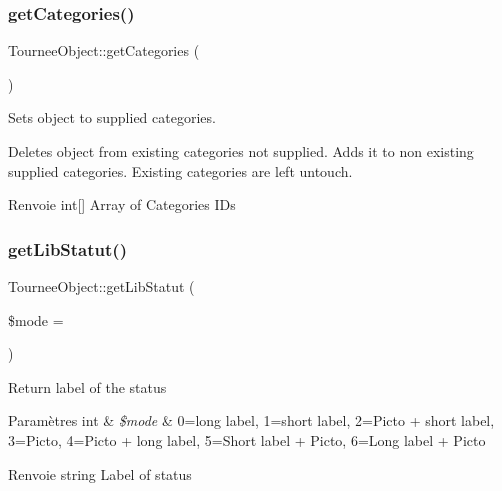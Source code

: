 \subsubsection{\texorpdfstring{get\+Categories()}{getCategories()}}
{\footnotesize\ttfamily Tournee\+Object\+::get\+Categories (\begin{DoxyParamCaption}{ }\end{DoxyParamCaption})}

Sets object to supplied categories.

Deletes object from existing categories not supplied. Adds it to non existing supplied categories. Existing categories are left untouch.

\begin{DoxyReturn}{Renvoie}
int\mbox{[}\mbox{]} Array of Categories I\+Ds 
\end{DoxyReturn}
\mbox{\label{classTourneeObject_a15de2c8fefd05e6d54d50e7508538216}} 
\subsubsection{\texorpdfstring{get\+Lib\+Statut()}{getLibStatut()}}
{\footnotesize\ttfamily Tournee\+Object\+::get\+Lib\+Statut (\begin{DoxyParamCaption}\item[{}]{\$mode = {} }\end{DoxyParamCaption})}

Return label of the status


\begin{DoxyParams}[1]{Paramètres}
int & {\em \$mode} & 0=long label, 1=short label, 2=Picto + short label, 3=Picto, 4=Picto + long label, 5=Short label + Picto, 6=Long label + Picto \\
\hline
\end{DoxyParams}
\begin{DoxyReturn}{Renvoie}
string Label of status 
\end{DoxyReturn}
\mbox{\label{classTourneeObject_a92abf5c0eb6c1c07aa18e1d9923cb808}} 
